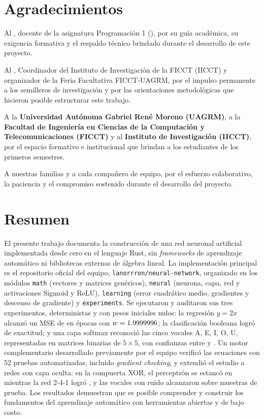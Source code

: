 \chapter*{Agradecimientos}
Al \textbf{\DocenteTutor}, docente de la asignatura Programación 1 (\Sigla), por su guía académica, su exigencia formativa y el respaldo técnico brindado durante el desarrollo de este proyecto.

Al \textbf{\CoordinadorIICCT}, Coordinador del Instituto de Investigación de la FICCT (IICCT) y organizador de la Feria Facultativa FICCT-UAGRM, por el impulso permanente a los semilleros de investigación y por las orientaciones metodológicas que hicieron posible estructurar este trabajo.

A la \textbf{Universidad Autónoma Gabriel René Moreno (UAGRM)}, a la \textbf{Facultad de Ingeniería en Ciencias de la Computación y Telecomunicaciones (FICCT)} y al \textbf{Instituto de Investigación (IICCT)}, por el espacio formativo e institucional que brindan a los estudiantes de los primeros semestres.

A nuestras familias y a cada compañero de equipo, por el esfuerzo colaborativo, la paciencia y el compromiso sostenido durante el desarrollo del proyecto.

\chapter*{Resumen}
El presente trabajo documenta la construcción de una red neuronal artificial implementada desde cero en el lenguaje Rust, sin \emph{frameworks} de aprendizaje automático ni bibliotecas externas de álgebra lineal. La implementación principal es el repositorio oficial del equipo, \texttt{lanorrron/neural-network}, organizado en los módulos \texttt{math} (vectores y matrices genéricos), \texttt{neural} (neurona, capa, red y activaciones Sigmoid y ReLU), \texttt{learning} (error cuadrático medio, gradientes y descenso de gradiente) y \texttt{experiments}. Se ejecutaron y auditaron sus tres experimentos, deterministas y con pesos iniciales nulos: la regresión $y = 2x$ alcanzó un MSE de \OfLinMseFin{} en \OfLinEpocas{} épocas con $w=1.9999996$; la clasificación booleana logró \OfBoolAcc{} de exactitud; y una capa softmax reconoció las cinco vocales A, E, I, O, U, representadas en matrices binarias de $5\times5$, con confianzas entre \OfVocConfMin{} y \OfVocConfMax. Un motor complementario desarrollado previamente por el equipo verificó las ecuaciones con 52 pruebas automatizadas, incluido \emph{gradient checking}, y extendió el estudio a redes con capa oculta: en la compuerta XOR, el perceptrón se estancó en \EdosAccPer{} mientras la red 2-4-1 logró \EdosAccMul{}, y las vocales con ruido alcanzaron \EtresAccPru{} sobre \EtresNPru{} muestras de prueba. Los resultados demuestran que es posible comprender y construir los fundamentos del aprendizaje automático con herramientas abiertas y de bajo costo.

